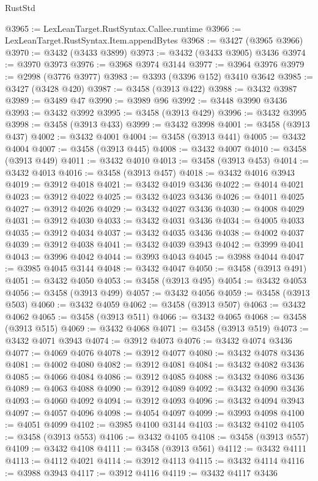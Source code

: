 \begin{lexlean}{RustStd}
\begin{coremodule}
@3965 := LexLeanTarget.RustSyntax.Callee.runtime
@3966 := LexLeanTarget.RustSyntax.Item.appendBytes
@3968 := @3427 (@3965 @3966)
@3970 := @3432 (@3433 @3899)
@3973 := @3432 (@3433 @3905) @3436
@3974 := @3970 @3973
@3976 := @3968 @3974 @3144
@3977 := @3964 @3976
@3979 := @2998 (@3776 @3977)
@3983 := @3393 (@3396 @152) @3410 @3642
@3985 := @3427 (@3428 @420)
@3987 := @3458 (@3913 @422)
@3988 := @3432 @3987
@3989 := @3489 @47
@3990 := @3989 @96
@3992 := @3448 @3990 @3436
@3993 := @3432 @3992
@3995 := @3458 (@3913 @429)
@3996 := @3432 @3995
@3998 := @3458 (@3913 @433)
@3999 := @3432 @3998
@4001 := @3458 (@3913 @437)
@4002 := @3432 @4001
@4004 := @3458 (@3913 @441)
@4005 := @3432 @4004
@4007 := @3458 (@3913 @445)
@4008 := @3432 @4007
@4010 := @3458 (@3913 @449)
@4011 := @3432 @4010
@4013 := @3458 (@3913 @453)
@4014 := @3432 @4013
@4016 := @3458 (@3913 @457)
@4018 := @3432 @4016 @3943
@4019 := @3912 @4018
@4021 := @3432 @4019 @3436
@4022 := @4014 @4021
@4023 := @3912 @4022
@4025 := @3432 @4023 @3436
@4026 := @4011 @4025
@4027 := @3912 @4026
@4029 := @3432 @4027 @3436
@4030 := @4008 @4029
@4031 := @3912 @4030
@4033 := @3432 @4031 @3436
@4034 := @4005 @4033
@4035 := @3912 @4034
@4037 := @3432 @4035 @3436
@4038 := @4002 @4037
@4039 := @3912 @4038
@4041 := @3432 @4039 @3943
@4042 := @3999 @4041
@4043 := @3996 @4042
@4044 := @3993 @4043
@4045 := @3988 @4044
@4047 := @3985 @4045 @3144
@4048 := @3432 @4047
@4050 := @3458 (@3913 @491)
@4051 := @3432 @4050
@4053 := @3458 (@3913 @495)
@4054 := @3432 @4053
@4056 := @3458 (@3913 @499)
@4057 := @3432 @4056
@4059 := @3458 (@3913 @503)
@4060 := @3432 @4059
@4062 := @3458 (@3913 @507)
@4063 := @3432 @4062
@4065 := @3458 (@3913 @511)
@4066 := @3432 @4065
@4068 := @3458 (@3913 @515)
@4069 := @3432 @4068
@4071 := @3458 (@3913 @519)
@4073 := @3432 @4071 @3943
@4074 := @3912 @4073
@4076 := @3432 @4074 @3436
@4077 := @4069 @4076
@4078 := @3912 @4077
@4080 := @3432 @4078 @3436
@4081 := @4002 @4080
@4082 := @3912 @4081
@4084 := @3432 @4082 @3436
@4085 := @4066 @4084
@4086 := @3912 @4085
@4088 := @3432 @4086 @3436
@4089 := @4063 @4088
@4090 := @3912 @4089
@4092 := @3432 @4090 @3436
@4093 := @4060 @4092
@4094 := @3912 @4093
@4096 := @3432 @4094 @3943
@4097 := @4057 @4096
@4098 := @4054 @4097
@4099 := @3993 @4098
@4100 := @4051 @4099
@4102 := @3985 @4100 @3144
@4103 := @3432 @4102
@4105 := @3458 (@3913 @553)
@4106 := @3432 @4105
@4108 := @3458 (@3913 @557)
@4109 := @3432 @4108
@4111 := @3458 (@3913 @561)
@4112 := @3432 @4111
@4113 := @4112 @4021
@4114 := @3912 @4113
@4115 := @3432 @4114
@4116 := @3988 @3943
@4117 := @3912 @4116
@4119 := @3432 @4117 @3436

\end{coremodule}
\end{lexlean}
